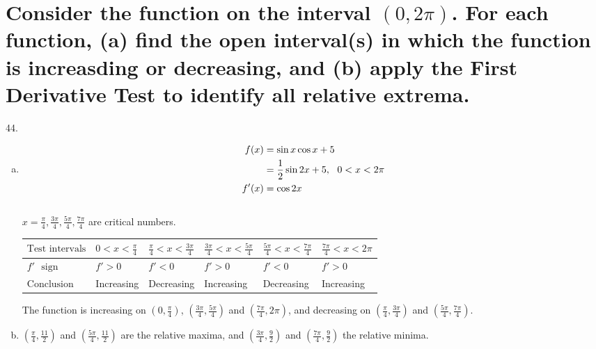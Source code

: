 \documentclass[11pt]{article}
\newcommand*{\set}{\setcounter{equation}{0}}
\begin{document}
\section{Consider the function on the interval $(0, 2\pi)$. For each function, (a) find the open interval(s) in which the function is increasding or decreasing, and (b) apply the First Derivative Test to identify all relative extrema.}
44.\begin{enumerate}[(a)]
    \item \begin{align}
        \set
        f(x)&=\sin x \cos x+5\\
        &=\frac{1}{2}\sin 2x+5,\,\,\,\,0<x<2\pi\\
        f'(x)&=\cos 2x
    \end{align}\\
    $x=\frac{\pi}{4}, \frac{3\pi}{4}, \frac{5\pi}{4}, \frac{7\pi}{4}$ are critical numbers.
    \begin{flushleft}
        \begin{table}[h]
                \begin{tabular}{|l|l|l|l|l|l|}
                    \hline
                    $\text{Test intervals}$ & $0<x<\frac{\pi}{4}$ & $\frac{\pi}{4}<x<\frac{3\pi}{4}$ & $\frac{3\pi}{4}<x<\frac{5\pi}{4}$ & $\frac{5\pi}{4}<x<\frac{7\pi}{4}$ & $\frac{7\pi}{4}<x<2\pi$\\ \hline
                    $f'\,\,\,\,\text{sign}$ & $f'>0$ & $f'<0$ & $f'>0$ & $f'<0$ & $f'>0$\\ \hline
                    $\text{Conclusion}$ & Increasing & Decreasing & Increasing & Decreasing & Increasing\\
                    \hline
             \end{tabular}
            \end{table}
        \end{flushleft}
        The function is increasing on $\left(0, \frac{\pi}{4}\right)$, $\left(\frac{3\pi}{4}, \frac{5\pi}{4}\right)$ and $\left(\frac{7\pi}{4}, 2\pi\right)$, and decreasing on $\left(\frac{\pi}{4}, \frac{3\pi}{4}\right)$ and $\left(\frac{5\pi}{4}, \frac{7\pi}{4}\right)$.
        \item $\left(\frac{\pi}{4}, \frac{11}{2}\right)$ and $\left(\frac{5\pi}{4}, \frac{11}{2}\right)$ are the relative maxima, and $\left(\frac{3\pi}{4}, \frac{9}{2}\right)$ and $\left(\frac{7\pi}{4}, \frac{9}{2}\right)$ the relative minima.
\end{enumerate}
\end{document}
